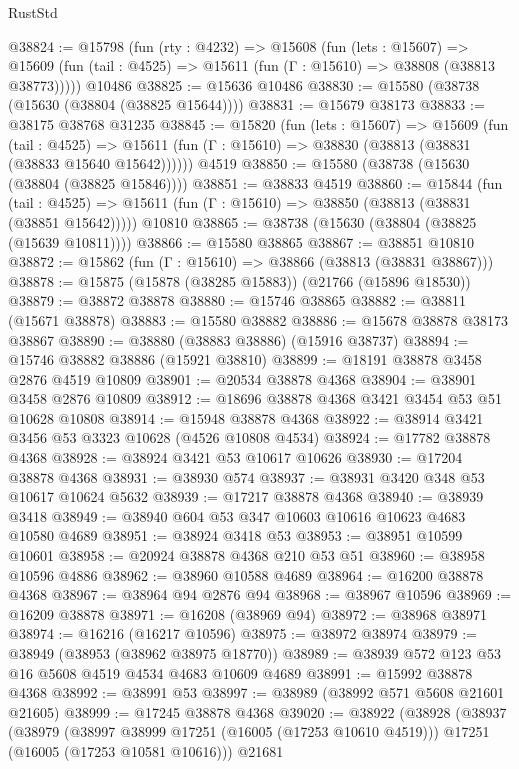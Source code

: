 \begin{lexlean}{RustStd}
\begin{coremodule}
@38824 := @15798
    (fun (rty : @4232) =>
    @15608
      (fun (lets : @15607) =>
      @15609 (fun (tail : @4525) => @15611 (fun (Γ : @15610) => @38808 (@38813 @38773)))))
    @10486
@38825 := @15636 @10486
@38830 := @15580 (@38738 (@15630 (@38804 (@38825 @15644))))
@38831 := @15679 @38173
@38833 := @38175 @38768 @31235
@38845 := @15820
    (fun (lets : @15607) =>
    @15609
      (fun (tail : @4525) =>
      @15611 (fun (Γ : @15610) => @38830 (@38813 (@38831 (@38833 @15640 @15642))))))
    @4519
@38850 := @15580 (@38738 (@15630 (@38804 (@38825 @15846))))
@38851 := @38833 @4519
@38860 := @15844
    (fun (tail : @4525) => @15611 (fun (Γ : @15610) => @38850 (@38813 (@38831 (@38851 @15642)))))
    @10810
@38865 := @38738 (@15630 (@38804 (@38825 (@15639 @10811))))
@38866 := @15580 @38865
@38867 := @38851 @10810
@38872 := @15862 (fun (Γ : @15610) => @38866 (@38813 (@38831 @38867)))
@38878 := @15875 (@15878 (@38285 @15883)) (@21766 (@15896 @18530))
@38879 := @38872 @38878
@38880 := @15746 @38865
@38882 := @38811 (@15671 @38878)
@38883 := @15580 @38882
@38886 := @15678 @38878 @38173 @38867
@38890 := @38880 (@38883 @38886) (@15916 @38737)
@38894 := @15746 @38882 @38886 (@15921 @38810)
@38899 := @18191 @38878 @3458 @2876 @4519 @10809
@38901 := @20534 @38878 @4368
@38904 := @38901 @3458 @2876 @10809
@38912 := @18696 @38878 @4368 @3421 @3454 @53 @51 @10628 @10808
@38914 := @15948 @38878 @4368
@38922 := @38914 @3421 @3456 @53 @3323 @10628 (@4526 @10808 @4534)
@38924 := @17782 @38878 @4368
@38928 := @38924 @3421 @53 @10617 @10626
@38930 := @17204 @38878 @4368
@38931 := @38930 @574
@38937 := @38931 @3420 @348 @53 @10617 @10624 @5632
@38939 := @17217 @38878 @4368
@38940 := @38939 @3418
@38949 := @38940 @604 @53 @347 @10603 @10616 @10623 @4683 @10580 @4689
@38951 := @38924 @3418 @53
@38953 := @38951 @10599 @10601
@38958 := @20924 @38878 @4368 @210 @53 @51
@38960 := @38958 @10596 @4886
@38962 := @38960 @10588 @4689
@38964 := @16200 @38878 @4368
@38967 := @38964 @94 @2876 @94
@38968 := @38967 @10596
@38969 := @16209 @38878
@38971 := @16208 (@38969 @94)
@38972 := @38968 @38971
@38974 := @16216 (@16217 @10596)
@38975 := @38972 @38974
@38979 := @38949 (@38953 (@38962 @38975 @18770))
@38989 := @38939 @572 @123 @53 @16 @5608 @4519 @4534 @4683 @10609 @4689
@38991 := @15992 @38878 @4368
@38992 := @38991 @53
@38997 := @38989 (@38992 @571 @5608 @21601 @21605)
@38999 := @17245 @38878 @4368
@39020 := @38922
    (@38928
      (@38937
        (@38979
          (@38997 @38999 @17251 (@16005 (@17253 @10610 @4519)))
          @17251
          (@16005 (@17253 @10581 @10616)))
        @21681

\end{coremodule}
\end{lexlean}
